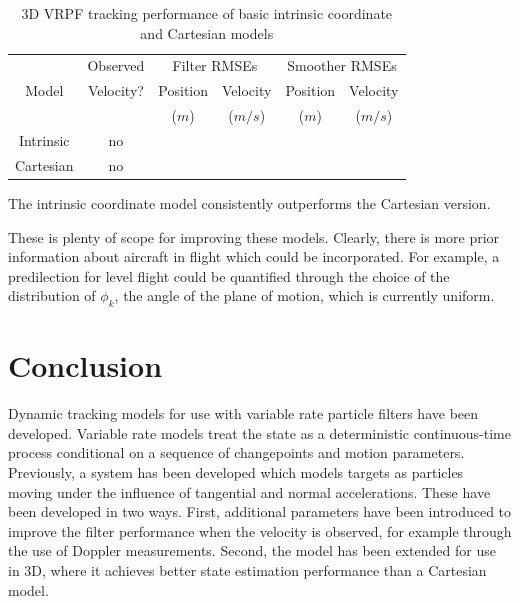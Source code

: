 \documentclass[conference]{IEEEtran}
\begin{document}
\begin{table}
\renewcommand{\arraystretch}{1.3}
\caption{3D VRPF tracking performance of basic intrinsic coordinate and Cartesian models}
\label{tab:3D_performance}
\centering
\begin{tabular}{|c|c|c|c|c|c|}
\hline
      & Observed  & \multicolumn{2}{c|}{Filter RMSEs}  & \multicolumn{2}{c|}{Smoother RMSEs}  \\
Model & Velocity? & Position & Velocity                & Position & Velocity                  \\
      &           & ($m$)    & ($m/s$)                 & ($m$)    & ($m/s$)                   \\
\hline
Intrinsic & no  &  &  &  &  \\
\hline
Cartesian & no  &  &  &  &  \\
\hline
\end{tabular}
\end{table}

The intrinsic coordinate model consistently outperforms the Cartesian version.

These is plenty of scope for improving these models. Clearly, there is more prior information about aircraft in flight which could be incorporated. For example, a predilection for level flight could be quantified through the choice of the distribution of $\phi_k$, the angle of the plane of motion, which is currently uniform.



\section{Conclusion}

Dynamic tracking models for use with variable rate particle filters have been developed. Variable rate models treat the state as a deterministic continuous-time process conditional on a sequence of changepoints and motion parameters. Previously, a system has been developed which models targets as particles moving under the influence of tangential and normal accelerations. These have been developed in two ways. First, additional parameters have been introduced to improve the filter performance when the velocity is observed, for example through the use of Doppler measurements. Second, the model has been extended for use in 3D, where it achieves better state estimation performance than a Cartesian model.





\end{document}
